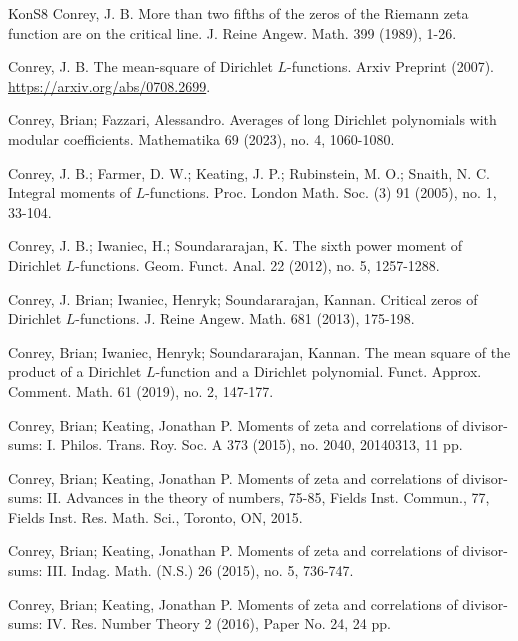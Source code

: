 \documentclass[11pt,reqno]{amsart}
\theoremstyle{definition}
\theoremstyle{definition}
\theoremstyle{remark}
\numberwithin{equation}{section}
\begin{document}
\begin{thebibliography}{KonS8}
	 Conrey, J. B. More than two fifths of the zeros of the Riemann zeta function are on the critical line. J. Reine Angew. Math. 399 (1989), 1-26.
	 
	 Conrey, J. B. The mean-square of Dirichlet $L$-functions. Arxiv Preprint (2007). \url{https://arxiv.org/abs/0708.2699}. 
	  
	 Conrey, Brian; Fazzari, Alessandro. Averages of long Dirichlet polynomials with modular coefficients. Mathematika 69 (2023), no. 4, 1060-1080.
	 
	 
	 Conrey, J. B.; Farmer, D. W.; Keating, J. P.; Rubinstein, M. O.; Snaith, N. C. Integral moments of $L$-functions. Proc. London Math. Soc. (3) 91 (2005), no. 1, 33-104.

	
	 
	 
	  Conrey, J. B.; Iwaniec, H.; Soundararajan, K. The sixth power moment of Dirichlet $L$-functions. Geom. Funct. Anal. 22 (2012), no. 5, 1257-1288.
	  
	  Conrey, J. Brian; Iwaniec, Henryk; Soundararajan, Kannan. Critical zeros of Dirichlet $L$-functions. J. Reine Angew. Math. 681 (2013), 175-198. 
	  
	   Conrey, Brian; Iwaniec, Henryk; Soundararajan, Kannan. The mean square of the product of a Dirichlet $L$-function and a Dirichlet polynomial. Funct. Approx. Comment. Math. 61 (2019), no. 2, 147-177.
	   
	   Conrey, Brian; Keating, Jonathan P. Moments of zeta and correlations of divisor-sums: I. Philos. Trans. Roy. Soc. A 373 (2015), no. 2040, 20140313, 11 pp.
	   
	Conrey, Brian; Keating, Jonathan P. Moments of zeta and correlations of divisor-sums: II. Advances in the theory of numbers, 75-85, Fields Inst. Commun., 77, Fields Inst. Res. Math. Sci., Toronto, ON, 2015.
	
	Conrey, Brian; Keating, Jonathan P. Moments of zeta and correlations of divisor-sums: III. Indag. Math. (N.S.) 26 (2015), no. 5, 736-747.
	
	Conrey, Brian; Keating, Jonathan P. Moments of zeta and correlations of divisor-sums: IV. Res. Number Theory 2 (2016), Paper No. 24, 24 pp. 
	   

\end{thebibliography}
\end{document}
